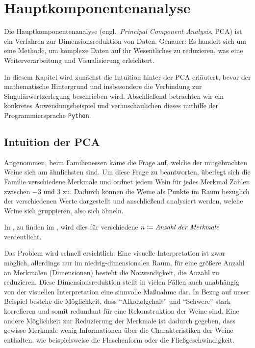 \chapter{Hauptkomponentenanalyse}   

Die Hauptkomponentenanalyse (engl.\ \emph{Principal Component Analysis}, PCA) ist ein Verfahren zur Dimensionsreduktion von Daten.
Genauer: Es handelt sich um eine Methode, um komplexe Daten auf ihr Wesentliches zu reduzieren, was eine Weiterverarbeitung und Visualisierung erleichtert.

In diesem Kapitel wird zunächst die Intuition hinter der PCA erläutert, bevor der mathematische Hintergrund und insbesondere die Verbindung zur Singulärwertzerlegung beschrieben wird.
Abschließend betrachten wir ein konkretes Anwendungsbeispiel und veranschaulichen dieses mithilfe der Programmiersprache \texttt{Python}.

\section{Intuition der PCA}\label{sec:pcaint}
Angenommen, beim Familienessen käme die Frage auf, welche der mitgebrachten Weine sich am ähnlichsten sind. 
Um diese Frage zu beantworten, überlegt sich die Familie verschiedene Merkmale und ordnet jedem Wein für jedes Merkmal Zahlen zwischen \num{-3} und \num{3} zu.
Dadurch können die Weine als Punkte im Raum bezüglich der verschiedenen Werte dargestellt und anschließend analysiert werden, welche Weine sich gruppieren, also sich ähneln. 

In , zu finden im , wird dies für verschiedene \(n \coloneqq \emph{Anzahl der Merkmale}\) verdeutlicht. 

Das Problem wird schnell ersichtlich:
Eine visuelle Interpretation ist zwar möglich, allerdings nur im niedrig-dimensionalen Raum, für eine größere Anzahl an Merkmalen (Dimensionen) besteht die Notwendigkeit, die Anzahl zu reduzieren.
Diese Dimensionsreduktion stellt in vielen Fällen auch unabhängig von der visuellen Interpretation eine sinnvolle Maßnahme dar.
In Bezug auf unser Beispiel bestehe die Möglichkeit, dass \enquote{Alkoholgehalt} und \enquote{Schwere} stark korrelieren und somit redundant für eine Rekonstruktion der Weine sind.
Eine andere Möglichkeit zur Reduzierung der Merkmale ist dadurch gegeben, dass gewisse Merkmale wenig Informationen über die Charakteristiken der Weine enthalten, wie beispielsweise die Flaschenform oder die Fließgeschwindigkeit.

